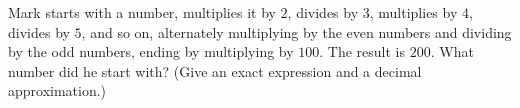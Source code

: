 Mark starts with a number, multiplies it by $2$, divides by $3$, multiplies by $4$, divides by $5$, and so on, alternately multiplying by the even numbers and dividing by the odd numbers, ending by multiplying by $100$. The result is $200$. What number did he start with? (Give an exact expression and a decimal approximation.)
